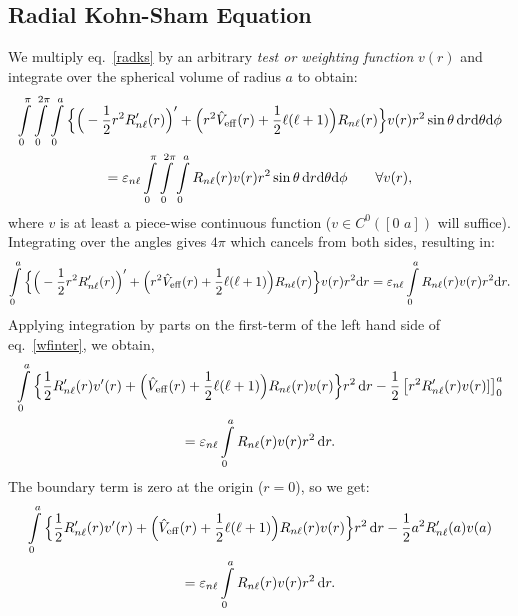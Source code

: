 \documentclass[12pt,dvipsnames]{article}
\begin{document}
\subsection{Radial Kohn-Sham Equation}
We multiply eq.~\eqref{radks} by an arbitrary 
\emph{test or weighting function\/} $v(r)$ and integrate over the spherical volume 
of radius $a$ to obtain: 
\begin{multline*}
\int\limits_0^{\pi} \int\limits_0^{2 \pi} \int\limits_0^a \Big\{\Big( -\frac{1}{2} r^2 R^\prime_{n \ell}(r) \Big)^\prime + \Big( r^2 \hat{V}_{\rm{eff}}(r) + \frac{1}{2} \ell (\ell + 1) \Big ) 
R_{n \ell}(r) \Big\} v(r) r^2 \sin\theta \, \mathrm{d}r \mathrm{d}\theta \mathrm{d}\phi \\
= \varepsilon_{n \ell} \int\limits_0^{\pi} \int\limits_0^{2 \pi} \int\limits_0^a R_{n \ell} (r) v(r) r^2 \sin\theta \, \mathrm{d}r \mathrm{d}\theta \mathrm{d}\phi \qquad \forall v(r),
\end{multline*}
where $v$ is at least a piece-wise continuous function ($v \in C^0([0 \, \, a])$ will suffice).
Integrating over the angles gives $4 \pi$ which cancels from both sides, resulting in:
\begin{equation}	\label{wfinter}
\int\limits_0^a \Big\{\Big( -\frac{1}{2} r^2 R^\prime_{n \ell}(r) \Big)^\prime + \Big( r^2 \hat{V}_{\rm{eff}}(r) + \frac{1}{2} \ell (\ell + 1) \Big ) 
R_{n \ell}(r) \Big\} v(r) r^2 \mathrm{d}r  = \varepsilon_{n \ell} \int\limits_0^a R_{n \ell} (r) v(r) r^2 \mathrm{d}r.
\end{equation}
Applying integration by parts on the first-term of the left hand side of eq.~\eqref{wfinter}, we obtain, 
\begin{multline*}
\int\limits_{0}^a \Big\{ \frac{1}{2} R^\prime_{n \ell}(r) v^\prime(r) + \Big( \hat{V}_{\rm{eff}}(r) + \frac{1}{2}\ell(\ell + 1) \Big ) R_{n \ell}(r) v(r) \Big\} r^2 \, \mathrm{d} r 
- \frac{1}{2} \left[ r^2 R^\prime_{n \ell}(r) v(r) ]\right]_0^a \\ 
= \varepsilon_{n \ell} \int\limits_{0}^a R_{n \ell} (r) v(r) r^2 \, \mathrm{d} r.
\end{multline*}
The boundary term is zero at the origin ($r = 0$), so we get:
\begin{multline*}
\int\limits_{0}^a \Big\{ \frac{1}{2} R^\prime_{n \ell}(r) v^\prime(r) + \Big( \hat{V}_{\rm{eff}}(r) + \frac{1}{2}\ell(\ell + 1) \Big ) R_{n \ell}(r) v(r) \Big\} r^2 \, \mathrm{d} r 
- \frac{1}{2} a^2 R^\prime_{n \ell}(a) v(a) \\ 
= \varepsilon_{n \ell} \int\limits_{0}^a R_{n \ell} (r) v(r) r^2 \, \mathrm{d} r.
\end{multline*}
\end{document}
